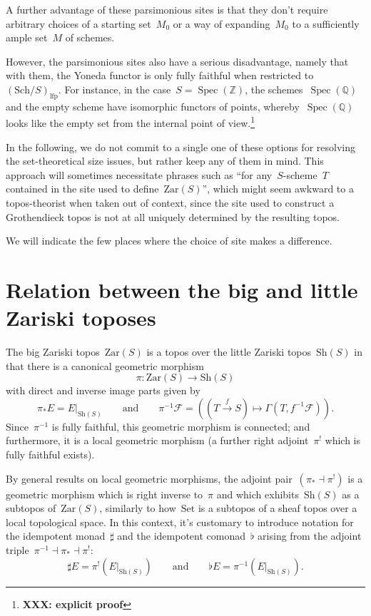 \documentclass[10pt,reqno,a4paper]{amsbook}
\theoremstyle{definition}
\theoremstyle{plain}
\theoremstyle{remark}
\newcommand{\ZZ}{\mathbb{Z}}
\newcommand{\F}{\mathcal{F}}
\newcommand{\QQ}{\mathbb{Q}}
\newcommand{\Set}{\mathrm{Set}}
\newcommand{\Sh}{\mathrm{Sh}}
\newcommand{\Zar}{\mathrm{Zar}}
\newcommand{\Sch}{\mathrm{Sch}}
\newcommand{\lfp}{\mathrm{lfp}}
\DeclareMathOperator{\Spec}{Spec}
\newcommand{\?}{\,{:}\,}
\renewcommand{\_}{\mathpunct{.}\,}
\newcommand{\xra}{\xrightarrow}
\newcommand{\XXX}[1]{\textbf{XXX: #1}}
\begin{document}
{A further advantage of these parsimonious sites is that they don't require arbitrary
choices of a starting set~$M_0$ or a way of expanding~$M_0$ to a sufficiently
ample set~$M$ of schemes.

However, the parsimonious sites also have a serious disadvantage, namely that
with them, the Yoneda functor is only fully faithful when restricted
to~$(\Sch/S)_\lfp$. For instance, in the case~$S = \Spec(\ZZ)$, the
schemes~$\Spec(\QQ)$ and the empty scheme have isomorphic functors of points,
whereby~$\Spec(\QQ)$ looks like the empty set from the internal point of
view.\footnote{\XXX{explicit proof}}

In the following, we do not commit to a single one of these options for
resolving the set-theoretical size issues, but rather keep any of them
in mind. This approach will sometimes necessitate phrases such as ``for
any~$S$-scheme~$T$ contained in the site used to define~$\Zar(S)$'', which might
seem awkward to a topos-theorist when taken out of context, since
the site used to construct a Grothendieck topos is not at all uniquely
determined by the resulting topos.

We will indicate the few places where the choice of site makes a difference.

}


\section{Relation between the big and little Zariski toposes}
\label{sect:relation-big-little}

The big Zariski topos~$\Zar(S)$ is a topos over the little Zariski
topos~$\Sh(S)$ in that there is a canonical geometric morphism
\[ \pi : \Zar(S) \longrightarrow \Sh(S) \]
with direct and inverse image parts given by
\[ \pi_*E = E|_{\Sh(S)} \qquad\text{and}\qquad
  \pi^{-1}\F = ((T \xra{f} S) \mapsto \Gamma(T, f^{-1}\F)). \]
Since~$\pi^{-1}$ is fully faithful, this geometric morphism is connected; and
furthermore, it is a local geometric morphism (a further right adjoint~$\pi^!$
which is fully faithful exists).

By general results on local geometric morphisms, the adjoint pair~$(\pi_*
\dashv \pi^!)$ is a geometric morphism which is right inverse to~$\pi$ and
which exhibits~$\Sh(S)$ as a subtopos of~$\Zar(S)$, similarly to how~$\Set$ is
a subtopos of a sheaf topos over a local topological space. In this context,
it's customary to introduce notation for the idempotent monad~$\sharp$ and the
idempotent comonad~$\flat$ arising from the adjoint triple~$\pi^{-1} \dashv
\pi_* \dashv \pi^!$:
\[ \sharp E = \pi^!(E|_{\Sh(S)}) \qquad\text{and}\qquad
  \flat E = \pi^{-1}(E|_{\Sh(S)}). \]
\end{document}
